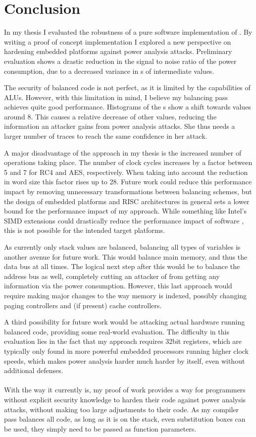 \section{Conclusion}
\label{conclusion}
In my thesis I evaluated the robustness of a pure software implementation of \dual{}.
By writing a proof of concept implementation I explored a new perspective on hardening embedded platforms against power analysis attacks.
Preliminary evaluation shows a drastic reduction in the signal to noise ratio of the power consumption, due to a decreased variance in \hammingw{}s of intermediate values.

The security of balanced code is not perfect, as it is limited by the capabilities of ALUs.
However, with this limitation in mind, I believe my balancing pass achieves quite good performance.
Histograms of the \hammingw{}s show a shift towards values around 8.
This causes a relative decrease of other values, reducing the information an attacker gains from power analysis attacks.
She thus needs a larger number of traces to reach the same confidence in her attack.

A major disadvantage of the approach in my thesis is the increased number of operations taking place.
The number of clock cycles increases by a factor between 5 and 7 for RC4 and AES, respectively.
When taking into account the reduction in word size this factor rises up to 28.
Future work could reduce this performance impact by removing unnecessary transformations between balancing schemes, but the design of embedded platforms and RISC architectures in general sets a lower bound for the performance impact of my approach.
While something like Intel's SIMD extensions\cite{lomont2011introduction} could drastically reduce the performance impact of software \dual{}, this is not possible for the intended target platforms.

As currently only stack values are balanced, balancing all types of variables is another avenue for future work.
This would balance main memory, and thus the data bus at all times.
The logical next step after this would be to balance the address bus as well, completely cutting an attacker of from getting any information via the power consumption.
However, this last approach would require making major changes to the way memory is indexed, possibly changing paging controllers and (if present) cache controllers.

A third possibility for future work would be attacking actual hardware running balanced code, providing some real-world evaluation.
The difficulty in this evaluation lies in the fact that my approach requires 32bit registers, which are typically only found in more powerful embedded processors running higher clock speeds, which makes power analysis harder much harder by itself, even without additional defenses.
\\
\\
With the way it currently is, my proof of work provides a way for programmers without explicit security knowledge to harden their code against power analysis attacks, without making too large adjustments to their code.
As my compiler pass balances all code, as long as it is on the stack, even substitution boxes can be used, they simply need to be passed as function parameters.

